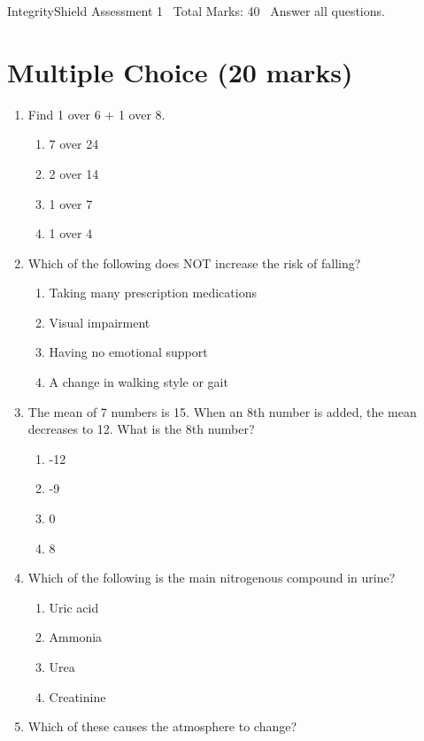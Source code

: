 \documentclass[12pt]{article}
\begin{document}
\begin{center}
IntegrityShield Assessment 1 \
Total Marks: 40 \
Answer all questions.
\end{center}

\section*{Multiple Choice (20 marks)}
\begin{enumerate}[label=\arabic*.]
\item Find 1 over 6 + 1 over 8.
\begin{enumerate}[label=(\alph*)]
    \item 7 over 24
    \item 2 over 14
    \item 1 over 7
    \item 1 over 4
\end{enumerate}
\item Which of the following does NOT increase the risk of falling?
\begin{enumerate}[label=(\alph*)]
    \item Taking many prescription medications
    \item Visual impairment
    \item Having no emotional support
    \item A change in walking style or gait
\end{enumerate}
\item The mean of 7 numbers is 15. When an 8th number is added, the mean decreases to 12. What is the 8th number?
\begin{enumerate}[label=(\alph*)]
    \item -12
    \item -9
    \item 0
    \item 8
\end{enumerate}
\item Which of the following is the main nitrogenous compound in urine?
\begin{enumerate}[label=(\alph*)]
    \item Uric acid
    \item Ammonia
    \item Urea
    \item Creatinine
\end{enumerate}
\item Which of these causes the atmosphere to change?
\begin{enumerate}[label=(\alph*)]

\end{enumerate}
\end{enumerate}
\end{document}
